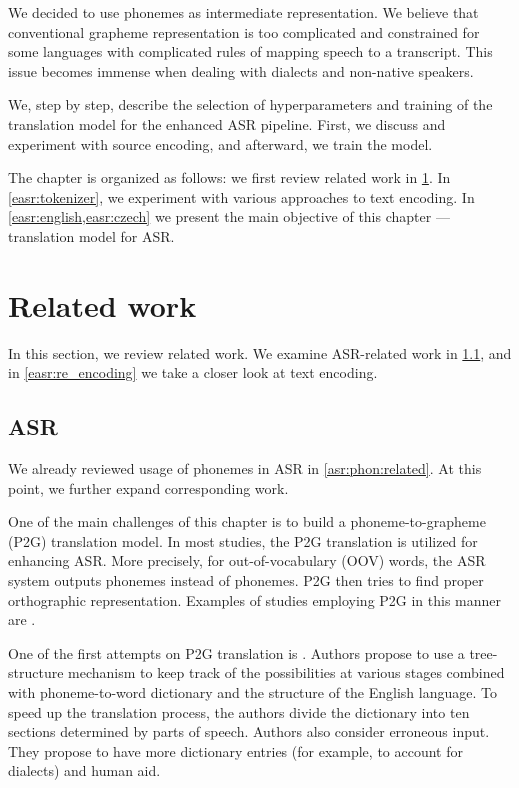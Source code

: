 We decided to use phonemes as intermediate representation. We believe that conventional grapheme representation is too complicated and constrained for some languages with complicated rules of mapping speech to a transcript. This issue becomes immense when dealing with dialects and non-native speakers.

We, step by step, describe the selection of hyperparameters and training of the translation model for the enhanced ASR pipeline. First, we discuss and experiment with source encoding, and afterward, we train the model.

The chapter is organized as follows: we first review related work in \cref{easr:related}. In \cref{easr:tokenizer}, we experiment with various approaches to text encoding. In \cref{easr:english,easr:czech} we present the main objective of this chapter --- translation model for ASR.




\section{Related work}
\label{easr:related}
In this section, we review related work. We examine ASR-related work in \cref{easr:rel_asr}, and in \cref{easr:re_encoding} we take a closer look at text encoding.

\subsection{ASR}
\label{easr:rel_asr}
We already reviewed usage of phonemes in ASR in \cref{asr:phon:related}. At this point, we further expand corresponding work.

One of the main challenges of this chapter is to build a phoneme-to-grapheme (P2G) translation model. In most studies, the P2G translation is utilized for enhancing ASR. More precisely, for out-of-vocabulary (OOV) words, the ASR system outputs phonemes instead of phonemes. P2G then tries to find proper orthographic representation. Examples of studies employing P2G in this manner are .

One of the first attempts on P2G translation is . Authors propose to use a tree-structure mechanism to keep track of the possibilities at various stages combined with phoneme-to-word dictionary and the structure of the English language. To speed up the translation process, the authors divide the dictionary into ten sections determined by parts of speech. Authors also consider erroneous input. They propose to have more dictionary entries (for example, to account for dialects) and human aid.

